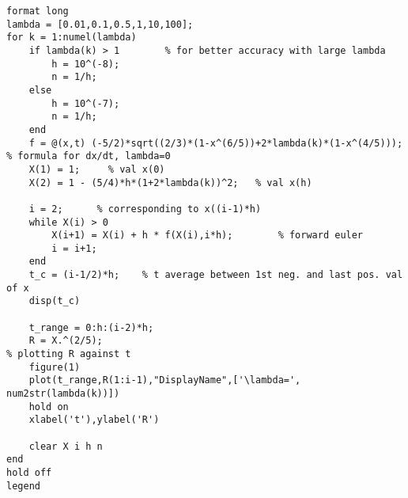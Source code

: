 \lstset{basicstyle=\footnotesize,style=myCustomMatlabStyle}
\begin{lstlisting}
format long
lambda = [0.01,0.1,0.5,1,10,100];
for k = 1:numel(lambda)
    if lambda(k) > 1        % for better accuracy with large lambda
        h = 10^(-8);
        n = 1/h;
    else
        h = 10^(-7);
        n = 1/h;
    end
    f = @(x,t) (-5/2)*sqrt((2/3)*(1-x^(6/5))+2*lambda(k)*(1-x^(4/5)));    % formula for dx/dt, lambda=0
    X(1) = 1;     % val x(0)
    X(2) = 1 - (5/4)*h*(1+2*lambda(k))^2;   % val x(h)
    
    i = 2;      % corresponding to x((i-1)*h)
    while X(i) > 0
        X(i+1) = X(i) + h * f(X(i),i*h);        % forward euler
        i = i+1;
    end
    t_c = (i-1/2)*h;    % t average between 1st neg. and last pos. val of x
    disp(t_c)
    
    t_range = 0:h:(i-2)*h;
    R = X.^(2/5);
% plotting R against t
    figure(1)
    plot(t_range,R(1:i-1),"DisplayName",['\lambda=', num2str(lambda(k))])
    hold on
    xlabel('t'),ylabel('R')
    
    clear X i h n
end
hold off
legend
\end{lstlisting}